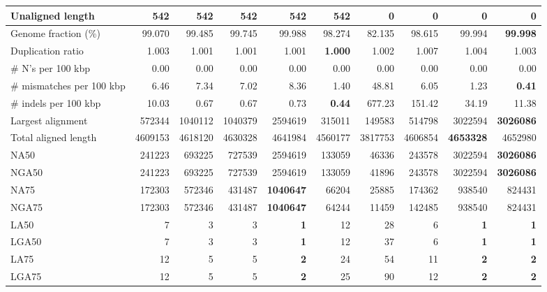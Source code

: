 \documentclass[12pt,a4paper]{article}
\begin{document}
\begin{table}[ht]
\begin{center}
\begin{tabular}{|l*{9}{|r}|}
Unaligned length & 542 & 542 & 542 & 542 & 542 & {\bf 0} & {\bf 0} & {\bf 0} & {\bf 0} \\ \hline
Genome fraction (\%) & 99.070 & 99.485 & 99.745 & 99.988 & 98.274 & 82.135 & 98.615 & 99.994 & {\bf 99.998} \\ \hline
Duplication ratio & 1.003 & 1.001 & 1.001 & 1.001 & {\bf 1.000} & 1.002 & 1.007 & 1.004 & 1.003 \\ \hline
\# N's per 100 kbp & 0.00 & 0.00 & 0.00 & 0.00 & 0.00 & 0.00 & 0.00 & 0.00 & 0.00 \\ \hline
\# mismatches per 100 kbp & 6.46 & 7.34 & 7.02 & 8.36 & 1.40 & 48.81 & 6.05 & 1.23 & {\bf 0.41} \\ \hline
\# indels per 100 kbp & 10.03 & 0.67 & 0.67 & 0.73 & {\bf 0.44} & 677.23 & 151.42 & 34.19 & 11.38 \\ \hline
Largest alignment & 572344 & 1040112 & 1040379 & 2594619 & 315011 & 149583 & 514798 & 3022594 & {\bf 3026086} \\ \hline
Total aligned length & 4609153 & 4618120 & 4630328 & 4641984 & 4560177 & 3817753 & 4606854 & {\bf 4653328} & 4652980 \\ \hline
NA50 & 241223 & 693225 & 727539 & 2594619 & 133059 & 46336 & 243578 & 3022594 & {\bf 3026086} \\ \hline
NGA50 & 241223 & 693225 & 727539 & 2594619 & 133059 & 41896 & 243578 & 3022594 & {\bf 3026086} \\ \hline
NA75 & 172303 & 572346 & 431487 & {\bf 1040647} & 66204 & 25885 & 174362 & 938540 & 824431 \\ \hline
NGA75 & 172303 & 572346 & 431487 & {\bf 1040647} & 64244 & 11459 & 142485 & 938540 & 824431 \\ \hline
LA50 & 7 & 3 & 3 & {\bf 1} & 12 & 28 & 6 & {\bf 1} & {\bf 1} \\ \hline
LGA50 & 7 & 3 & 3 & {\bf 1} & 12 & 37 & 6 & {\bf 1} & {\bf 1} \\ \hline
LA75 & 12 & 5 & 5 & {\bf 2} & 24 & 54 & 11 & {\bf 2} & {\bf 2} \\ \hline
LGA75 & 12 & 5 & 5 & {\bf 2} & 25 & 90 & 12 & {\bf 2} & {\bf 2} \\ \hline
\end{tabular}
\end{center}
\end{table}
\end{document}
